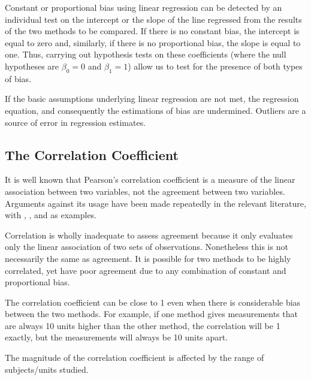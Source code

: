 \documentclass[12pt, a4paper]{report}
\theoremstyle{plain}
\theoremstyle{definition}
\theoremstyle{remark}
\begin{document}
	Constant or proportional bias using linear regression can be detected by an individual test on the intercept or the slope of the line regressed from the results of the two methods to be compared. If there is no constant bias, the intercept is equal to zero and, similarly, if there is no proportional bias, the slope is equal to one. Thus, carrying out hypothesis tests on these coefficients (where the null hypotheses are $\beta_0=0$ and $\beta_1=1$) allow us to test for the presence of both types of bias.

	
		If the basic assumptions underlying linear regression are not met, the regression equation, and consequently the estimations of bias are undermined. Outliers are a source of error in regression estimates.
		
	\subsection{The Correlation Coefficient}
	
	It is well known that Pearson's correlation coefficient is a measure of the linear association between two variables, not the agreement between two variables. Arguments against its usage have been made repeatedly in the relevant literature,  with \citet{BA83}, \citet{BA86}, \citet{BA2003} and \citet{giavarina2015understanding} as examples.
	
	
	Correlation is wholly inadequate to assess agreement because it only evaluates only the linear association of two sets of observations.  Nonetheless this is not necessarily the same as agreement. It is possible for two methods to
	be highly correlated, yet have poor agreement due to any combination of constant and proportional bias.	
	
	The correlation coefficient can be close to 1 even when there is considerable bias between the two methods. For example, if one method gives measurements that are always 10 units higher than the other method, the correlation will be 1 exactly, but the measurements will always be 10 units apart.
	
	The magnitude of the correlation coefficient is affected by the range of subjects/units studied. 
	
\end{document}
